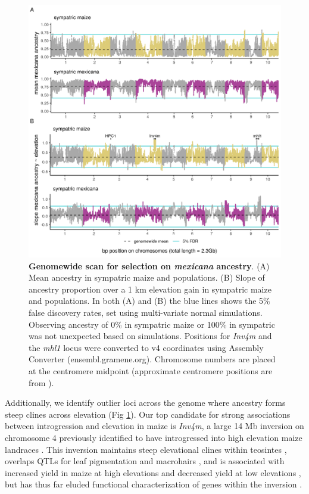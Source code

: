 \begin{figure}[h!tb]
\includegraphics[width=.95\textwidth]{chapter2/figures/multi_maize_mexicana_genome_scan.png}
\caption{\color{Gray} \textbf{Genomewide scan for selection on \textit{mexicana} ancestry}. (A) Mean \mexicana ancestry in sympatric maize  and \mexicana populations. (B) Slope of \mexicana ancestry proportion over a 1 km elevation gain in sympatric maize and \mexicana populations.
In both (A) and (B) the blue lines shows the 5\% false discovery rates, set using multi-variate normal simulations. 
Observing \mexicana ancestry of 0\% in sympatric maize or 100\% in sympatric \mexicana was not unexpected based on simulations.
Positions for \textit{Inv4m} \cite{Pyhajarvi:2013jc} and the \textit{mhl1} locus \cite{Moose_Lauter_Carlson:2004_mhl1} were converted to  v4 coordinates using Assembly Converter (ensembl.gramene.org). Chromosome numbers are placed at the centromere midpoint (approximate centromere positions are from \cite{Jiao:2017}).}
\label{genome_scan}
\end{figure}

Additionally, we identify outlier loci across the genome where \mexicana ancestry forms steep clines across elevation (Fig \ref{genome_scan}). 
Our top candidate for strong associations between introgression and elevation in maize is \textit{Inv4m}, a large 14 Mb inversion on chromosome 4 previously identified to have introgressed into high elevation maize landraces \cite{Hufford:2013_crop_wild, Wang:2017, Gonzalez-Segovia:2019, Crow:2020_inv4m}. 
This inversion maintains steep elevational clines within teosintes \cite{Pyhajarvi:2013jc}, overlaps QTLs for leaf pigmentation \cite{Lauter:2004} and macrohairs \cite{Lauter:2004}, and is associated with increased yield in maize at high elevations and decreased yield at low elevations \cite{Crow:2020_inv4m}, but has thus far eluded functional characterization of genes within the inversion \cite{Crow:2020_inv4m}. 


